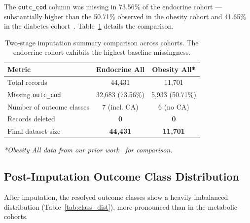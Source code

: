 \documentclass[10pt,twocolumn]{article}
\begin{document}
The \texttt{outc\_cod} column was missing in 73.56\% of the endocrine cohort --- substantially higher than the 50.71\% observed in the obesity cohort and 41.65\% in the diabetes cohort~\cite{telkar2026obesity}. Table~\ref{tab:imputation} details the comparison.
 
\begin{table}[!t]
\caption{Two-stage imputation summary comparison across cohorts. The endocrine cohort exhibits the highest baseline missingness.}
\label{tab:imputation}
\centering\small\setlength{\tabcolsep}{4pt}
\begin{tabularx}{\columnwidth}{|X|c|c|}
\hline
\rowcolor{tableHead}
\color{white}\textbf{Metric} &
\color{white}\textbf{Endocrine All} &
\color{white}\textbf{Obesity All*}\\
\hline
\rowcolor{rowA} Total records & 44,431 & 11,701\\
\hline
\rowcolor{rowB} Missing \texttt{outc\_cod} & 32,683 (73.56\%) & 5,933 (50.71\%)\\
\hline
\rowcolor{rowA} Number of outcome classes & 7 (incl. CA) & 6 (no CA)\\
\hline
\rowcolor{rowB} Records deleted & \textbf{0} & \textbf{0}\\
\hline
\rowcolor{rowA} Final dataset size & \textbf{44,431} & \textbf{11,701}\\
\hline
\end{tabularx}
 
\smallskip
\noindent\footnotesize\textit{*Obesity All data from our prior work~\cite{telkar2026obesity} for comparison.}
\end{table}
 
\subsection{Post-Imputation Outcome Class Distribution}
 
After imputation, the resolved outcome classes show a heavily imbalanced distribution (Table~\ref{tab:class_dist}), more pronounced than in the metabolic cohorts.
 
\end{document}

